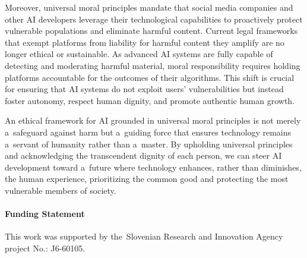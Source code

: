 \documentclass[%
  manuscript=article,
  year=2024,
  volume=77,
  doi=10.59203/zfn.77.707,
]{zfn}
\begin{document}
Moreover, universal moral principles mandate that social media companies and other AI developers leverage their technological capabilities to proactively protect vulnerable populations and eliminate harmful content. Current legal frameworks that exempt platforms from liability for harmful content they amplify are no longer ethical or sustainable. As advanced AI systems are fully capable of detecting and moderating harmful material, moral responsibility requires holding platforms accountable for the outcomes of their algorithms. This shift is crucial for ensuring that AI systems do not exploit users' vulnerabilities but instead foster autonomy, respect human dignity, and promote authentic human growth.



An ethical framework for AI grounded in universal moral principles is not merely a~safeguard against harm but a~guiding force that ensures technology remains a~servant of humanity rather than a~master. By upholding universal principles and acknowledging the transcendent dignity of each person, we can steer AI development toward a~future where technology enhances, rather than diminishes, the human experience, prioritizing the common good and protecting the most vulnerable members of society.




\paragraph{Funding Statement}
This work was supported by the~Slovenian Research and Innovation Agency project No.: J6-60105.


\printbibliography
\end{document}
